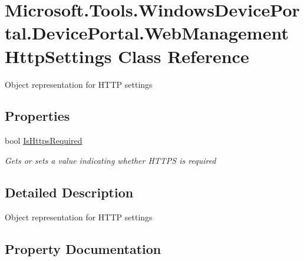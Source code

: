 \hypertarget{class_microsoft_1_1_tools_1_1_windows_device_portal_1_1_device_portal_1_1_web_management_http_settings}{}\section{Microsoft.\+Tools.\+Windows\+Device\+Portal.\+Device\+Portal.\+Web\+Management\+Http\+Settings Class Reference}
\label{class_microsoft_1_1_tools_1_1_windows_device_portal_1_1_device_portal_1_1_web_management_http_settings}


Object representation for H\+T\+TP settings  


\subsection*{Properties}
\begin{DoxyCompactItemize}
\item 
bool \hyperlink{class_microsoft_1_1_tools_1_1_windows_device_portal_1_1_device_portal_1_1_web_management_http_settings_a0b2e255bad26460f977010fda3aacaf2}{Is\+Https\+Required}
\begin{DoxyCompactList}\small\item\em Gets or sets a value indicating whether H\+T\+T\+PS is required \end{DoxyCompactList}\end{DoxyCompactItemize}


\subsection{Detailed Description}
Object representation for H\+T\+TP settings 



\subsection{Property Documentation}
